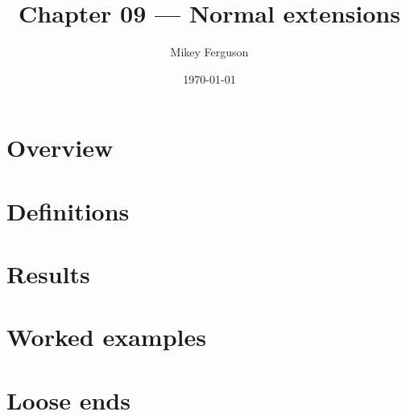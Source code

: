\documentclass[11pt]{article}
\title{Chapter 09 --- Normal extensions}
\author{Mikey Ferguson}
\date{\today}
\begin{document}
\maketitle
\tableofcontents
\bigskip

\section{Overview}

\section{Definitions}

\section{Results}

\section{Worked examples}

\section{Loose ends}
\end{document}
